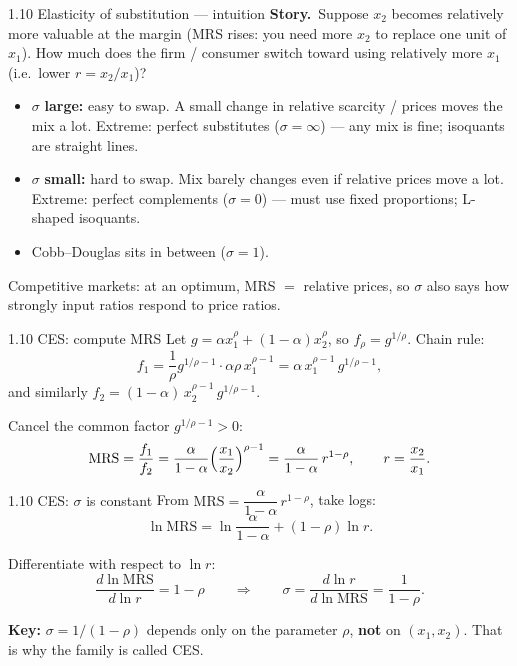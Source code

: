 \documentclass[11pt,aspectratio=169]{beamer}
\begin{document}
\begin{frame}{1.10 Elasticity of substitution --- intuition}
  \footnotesize
  \textbf{Story.}\ Suppose \(x_2\) becomes relatively more valuable at the margin
  (MRS rises: you need more \(x_2\) to replace one unit of \(x_1\)).
  How much does the firm / consumer switch toward using relatively more \(x_1\)
  (i.e.\ lower \(r=x_2/x_1\))?

  \medskip
  \begin{itemize}\itemsep3pt
    \item $\sigma$ \textbf{large:} easy to swap. A small change in relative
      scarcity / prices moves the mix a lot. Extreme: perfect substitutes
      ($\sigma=\infty$) --- any mix is fine; isoquants are straight lines.
    \item $\sigma$ \textbf{small:} hard to swap. Mix barely changes even if
      relative prices move a lot. Extreme: perfect complements ($\sigma=0$)
      --- must use fixed proportions; L-shaped isoquants.
    \item Cobb--Douglas sits in between ($\sigma=1$).
  \end{itemize}

  \medskip
  {\scriptsize Competitive markets: at an optimum, MRS $=$ relative prices, so
  $\sigma$ also says how strongly input ratios respond to price ratios.}
\end{frame}

\begin{frame}{1.10 CES: compute MRS}
  \footnotesize
  Let $g=\alpha x_1^{\rho}+(1-\alpha)x_2^{\rho}$, so $f_{\rho}=g^{1/\rho}$.
  Chain rule:
  \[
    f_1
    =\frac{1}{\rho}g^{1/\rho-1}\cdot\alpha\rho\,x_1^{\rho-1}
    =\alpha\,x_1^{\rho-1}\,g^{1/\rho-1},
  \]
  and similarly
  $f_2=(1-\alpha)\,x_2^{\rho-1}\,g^{1/\rho-1}$.

  \medskip
  Cancel the common factor $g^{1/\rho-1}>0$:
  \[
    \mathrm{MRS}
    =\frac{f_1}{f_2}
    =\frac{\alpha}{1-\alpha}\Bigl(\frac{x_1}{x_2}\Bigr)^{\rho-1}
    =\frac{\alpha}{1-\alpha}\,r^{1-\rho},
    \qquad
    r=\frac{x_2}{x_1}.
  \]
\end{frame}

\begin{frame}{1.10 CES: $\sigma$ is constant}
  \footnotesize
  From
  $\mathrm{MRS}=\dfrac{\alpha}{1-\alpha}\,r^{1-\rho}$,
  take logs:
  \[
    \ln\mathrm{MRS}
    =\ln\frac{\alpha}{1-\alpha}+(1-\rho)\ln r.
  \]

  \medskip
  Differentiate with respect to $\ln r$:
  \[
    \frac{d\ln\mathrm{MRS}}{d\ln r}=1-\rho
    \qquad\Rightarrow\qquad
    \sigma
    =\frac{d\ln r}{d\ln\mathrm{MRS}}
    =\frac{1}{1-\rho}.
  \]

  \medskip
  \textbf{Key:} $\sigma=1/(1-\rho)$ depends only on the parameter $\rho$,
  \textbf{not} on $(x_1,x_2)$. That is why the family is called CES.
\end{frame}
\end{document}

